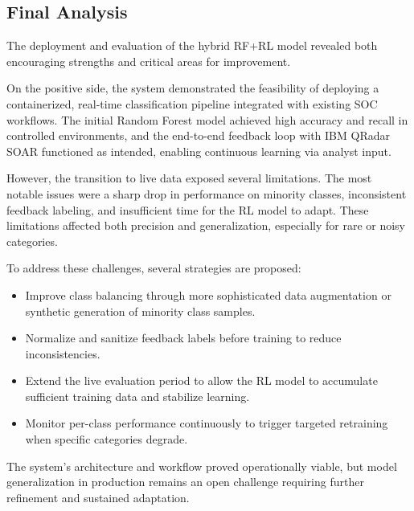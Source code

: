 \subsection{Final Analysis}

The deployment and evaluation of the hybrid RF+RL model revealed both encouraging strengths and critical areas for improvement.

On the positive side, the system demonstrated the feasibility of deploying a containerized, real-time classification pipeline integrated with existing SOC workflows. 
The initial Random Forest model achieved high accuracy and recall in controlled environments, and the end-to-end feedback loop with IBM QRadar SOAR functioned as intended, enabling continuous learning via analyst input.

However, the transition to live data exposed several limitations. 
The most notable issues were a sharp drop in performance on minority classes, inconsistent feedback labeling, and insufficient time for the RL model to adapt. 
These limitations affected both precision and generalization, especially for rare or noisy categories.

To address these challenges, several strategies are proposed:
\begin{itemize}
    \item Improve class balancing through more sophisticated data augmentation or synthetic generation of minority class samples.
    \item Normalize and sanitize feedback labels before training to reduce inconsistencies.
    \item Extend the live evaluation period to allow the RL model to accumulate sufficient training data and stabilize learning.
    \item Monitor per-class performance continuously to trigger targeted retraining when specific categories degrade.
\end{itemize}

The system's architecture and workflow proved operationally viable, but model generalization in production remains an open challenge requiring further refinement and sustained adaptation.


